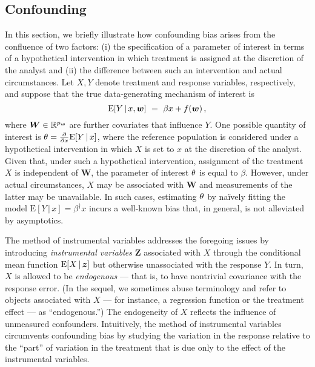 \documentclass{uwstat572}
\newcommand{\be}{\begin{equation}}
\newcommand{\ee}{\end{equation}}
\theoremstyle{definition}
\theoremstyle{remark}
\newcommand{\R}{\ensuremath{\mathbb{R}}}
\newcommand{\gb}{\beta}
\newcommand{\gep}{\epsilon}
\newcommand{\pdd}[2]{\frac{\partial #1}{\partial #2}}
\newcommand{\E}{\mathrm{E}}
\newcommand{\bs}[1]{\boldsymbol{#1}}
\numberwithin{equation}{section}
\begin{document}
%

\subsection{Confounding}\label{ss:conf}
\newcommand{\efc}{\bs{\gamma}}
\newcommand{\W}{\bs{W}}
\newcommand{\Z}{\bs{Z}}
\newcommand{\erry}{\gep}
\newcommand{\pd}{\partial}

In this section, we briefly illustrate how confounding bias arises from the confluence of two factors: (i) the specification of a parameter of interest in terms of a hypothetical intervention in which treatment is assigned at the discretion of the analyst and (ii) the difference between such an intervention and actual circumstances. Let $X, Y$ denote treatment and response variables, respectively, and suppose that the true data-generating mechanism of interest is
\be\label{eq:conf1}
	\E[Y\,|\,x, \w] \ = \ \gb x + f(\w) \,, %
\ee
where $\W\in\R^\pw$ are further covariates that influence $Y$. One possible quantity of interest is $\eft = \pdd{}{x}\E[Y\,|\,x]$, where the reference population is considered under a hypothetical intervention in which $X$ is set to $x$ at the discretion of the analyst. Given that, under such a hypothetical intervention, assignment of the treatment $X$ is independent of $\W$, the parameter of interest $\theta$ is equal to $\gb$. However, under actual circumstances, $X$ may be associated with $\W$ and measurements of the latter may be unavailable. In such cases, estimating $\theta$ by na\"ively fitting the model $\E[Y\,|\,x] = \gb^\dagger x$ incurs a well-known bias that, in general, is not alleviated by asymptotics.
 
The method of instrumental variables addresses the foregoing issues by introducing \emph{instrumental variables} $\Z$ associated with $X$ through the conditional mean function $\E[X\,|\,\z]$ but otherwise unassociated with the response $Y$. In turn, $X$ is allowed to be \emph{endogenous} --- that is, to have nontrivial covariance with the response error. (In the sequel, we sometimes abuse terminology and refer to objects associated with $X$ --- for instance, a regression function or the treatment effect --- as ``endogenous.'') The endogeneity of $X$ reflects the influence of unmeasured confounders. Intuitively, the method of instrumental variables circumvents confounding bias by studying the variation in the response relative to the ``part'' of variation in the treatment that is due only to the effect of the instrumental variables. 
\end{document}
